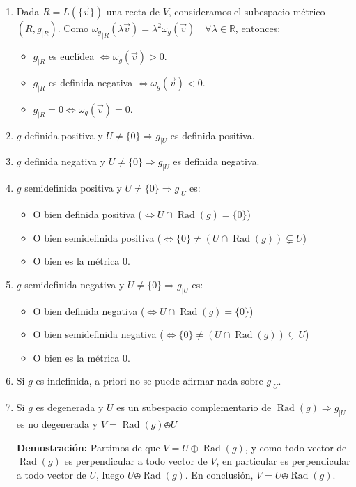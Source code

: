 \documentclass[x11names,table]{report}
\DeclareMathOperator{\rad}{Rad}
\begin{document}
\begin{enumerate}
\item Dada $R=L(\{\vec{v}\})$ una recta de $V$, consideramos el subespacio métrico $(R,g_{|R})$. Como ${\omega_g}_{|R}(\lambda \vec{v})=\lambda^2\omega_g(\vec{v})\quad\forall\lambda\in\mathbb{R}$, entonces:
\begin{itemize}
\item $g_{|R}$ es euclídea $\Leftrightarrow \omega_g(\vec{v})>0$.
\item $g_{|R}$ es definida negativa $\Leftrightarrow \omega_g(\vec{v})<0$.
\item $g_{|R}=0\Leftrightarrow \omega_g(\vec{v})=0$.
\end{itemize} 
\item $g$ definida positiva y $U\not=\{0\}\Longrightarrow g_{|U}$ es definida positiva.
\item $g$ definida negativa y $U\not=\{0\}\Longrightarrow g_{|U}$ es definida negativa.
\item $g$ semidefinida positiva y $U\not=\{0\}\Longrightarrow g_{|U}$ es:
\begin{itemize}
\item O bien definida positiva ($\Leftrightarrow U\cap \rad(g)=\{0\}$)
\item O bien semidefinida positiva ($\Leftrightarrow \{0\}\not=(U\cap\rad(g))\subsetneq U$)
\item O bien es la métrica 0.
\end{itemize}
\item $g$ semidefinida negativa y $U\not=\{0\}\Longrightarrow g_{|U}$ es:
\begin{itemize}
\item O bien definida negativa ($\Leftrightarrow U\cap \rad(g)=\{0\}$)
\item O bien semidefinida negativa ($\Leftrightarrow \{0\}\not=(U\cap\rad(g))\subsetneq U$)
\item O bien es la métrica 0.
\end{itemize}
\item Si $g$ es indefinida, a priori no se puede afirmar nada sobre $g_{|U}$.
\item Si $g$ es degenerada y $U$  es un subespacio complementario de $\rad(g)\Rightarrow g_{|U}$ es no degenerada y $V=\rad(g)\obot U$

\textbf{Demostración:}
Partimos de que $V=U\oplus\rad(g)$, y como todo vector de $\rad(g)$ es perpendicular a todo vector de $V$, en particular es perpendicular a todo vector de $U$, luego $U\obot\rad(g)$. En conclusión, $V=U\obot\rad(g)$. 


\end{enumerate}
\end{document}
